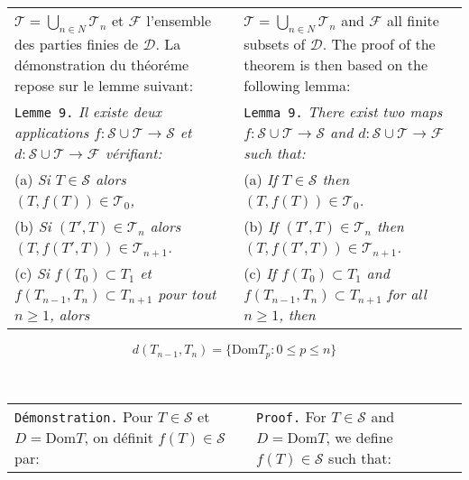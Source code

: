 \documentclass[12pt]{article}
\theoremstyle{plain}
\theoremstyle{definition}
\theoremstyle{remark}
\begin{document}
\begin{tabular}{p{2.8in} p{2.8in}}

$\mathcal{T} = \bigcup_{n\in N} \mathcal{T}_n$ et $\mathcal{F}$ l'ensemble des parties finies de $\mathcal{D}$. La d\'emonstration du th\'eor\'eme repose sur le lemme suivant:

&

$\mathcal{T} = \bigcup_{n\in N} \mathcal{T}_n$ and $\mathcal{F}$ all finite subsets of $\mathcal{D}$. The proof of the theorem is then based on the following lemma:

\\

\texttt{Lemme 9.} \textit{Il existe deux applications $f: \mathcal{S} \cup \mathcal{T} \to \mathcal{S}$ et $d: \mathcal{S} \cup \mathcal{T} \to \mathcal{F}$ v\'erifiant:}

&

\texttt{Lemma 9.} \textit{There exist two maps $f: \mathcal{S} \cup \mathcal{T} \to \mathcal{S}$ and $d: \mathcal{S} \cup \mathcal{T} \to \mathcal{F}$ such that:}

\\

(a) \textit{Si $T \in \mathcal{S}$ alors $(T,f(T)) \in \mathcal{T}_0$,}

&

(a) \textit{If $T \in \mathcal{S}$ then $(T,f(T)) \in \mathcal{T}_0$.}

\\

(b) \textit{Si $(T',T) \in \mathcal{T}_n$ alors $(T,f(T',T))\in\mathcal{T}_{n+1}$.}

&

(b) \textit{If $(T',T) \in \mathcal{T}_n$ then $(T,f(T',T))\in\mathcal{T}_{n+1}$.}

\\

(c) \textit{Si $f(T_0) \subset T_1$ et $f(T_{n-1},T_n) \subset T_{n+1}$ pour tout $n \geq 1$, alors}

&

(c) \textit{If $f(T_0) \subset T_1$ and $f(T_{n-1},T_n) \subset T_{n+1}$ for all $n \geq 1$, then}

\end{tabular}

\[ d(T_{n-1},T_n) = \{\textrm{Dom}T_p : 0 \leq p \leq n\}\]

\

\begin{tabular}{p{2.8in} p{2.8in}}

\texttt{D\'emonstration.} Pour $T \in \mathcal{S}$ et $D = \textrm{Dom}T$, on d\'efinit $f(T) \in \mathcal{S}$ par:

&

\texttt{Proof.} For $T \in \mathcal{S}$ and $D = \textrm{Dom}T$, we define $f(T) \in \mathcal{S}$ such that:

\end{tabular}
\end{document}
